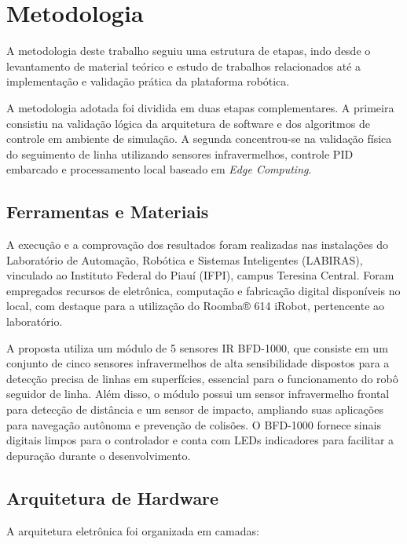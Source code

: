 \chapter{Metodologia}

A metodologia deste trabalho seguiu uma estrutura de etapas, indo desde o levantamento de material teórico e estudo de trabalhos relacionados até a implementação e validação prática da plataforma robótica.

A metodologia adotada foi dividida em duas etapas complementares. A primeira consistiu na validação lógica da arquitetura de software e dos algoritmos de controle em ambiente de simulação. A segunda concentrou-se na validação física do seguimento de linha utilizando sensores infravermelhos, controle PID embarcado e processamento local baseado em \textit{Edge Computing}.


\section{Ferramentas e Materiais}

A execução e a comprovação dos resultados foram realizadas nas instalações do Laboratório de Automação, Robótica e Sistemas Inteligentes (LABIRAS), vinculado ao Instituto Federal do Piauí (IFPI), campus Teresina Central. Foram empregados recursos de eletrônica, computação e fabricação digital disponíveis no local, com destaque para a utilização do Roomba® 614 iRobot, pertencente ao laboratório.

A proposta utiliza um módulo de 5 sensores IR BFD-1000, que consiste em um conjunto de cinco sensores infravermelhos de alta sensibilidade dispostos para a detecção precisa de linhas em superfícies, essencial para o funcionamento do robô seguidor de linha. Além disso, o módulo possui um sensor infravermelho frontal para detecção de distância e um sensor de impacto, ampliando suas aplicações para navegação autônoma e prevenção de colisões. O BFD-1000 fornece sinais digitais limpos para o controlador e conta com LEDs indicadores para facilitar a depuração durante o desenvolvimento.


\section{Arquitetura de Hardware}

A arquitetura eletrônica foi organizada em camadas:

